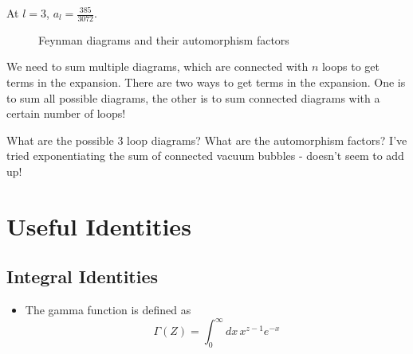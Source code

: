 \documentclass[11pt, oneside]{article}   	%
\theoremstyle{slanted}
\begin{document}
At  $l = 3 $, $ a _ l = \frac{385}{ 3072}$. 

\begin{figure}[htpb]
	\centering
	
	\caption{Feynman diagrams and their automorphism 
	factors}%
	\label{fig:}
\end{figure}
We need to sum multiple diagrams, 
which are connected with $ n $ loops to get terms in the 
expansion. 
There are two ways to get terms in the expansion. 
One is to sum all possible diagrams, 
the other is to sum connected diagrams with a certain number of loops! 

What are the possible 3 loop diagrams? 
What are the automorphism factors?
I've tried exponentiating 
the sum of connected vacuum bubbles  - doesn't 
seem to add up!


\section{Useful Identities}

\subsection{Integral Identities}
\begin{itemize}
	\item The gamma function is defined as 
		\[
		 \Gamma\left( Z   \right)  = \int_0^{ \infty} dx \, x ^{ z - 1 } e ^{ - x }
		\] 
\end{itemize}
\end{document}
